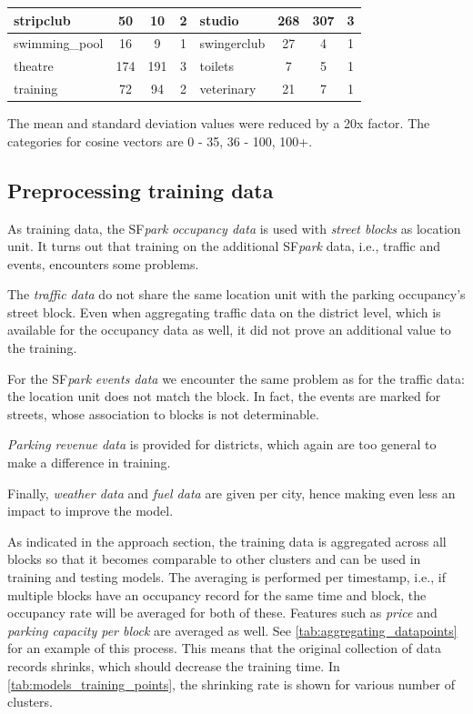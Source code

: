 \documentclass{ws-ijait}
\newcommand{\cmmnt}[1]{\ignorespaces}
\begin{document}
\begin{table}[!ht]
{\begin{tabular}{ | l | c | c | c || l | c | c | c |}
					stripclub & 50 & 10 & 2 & studio & 268 & 307 & 3 \\ \hline
					swimming\_pool & 16 & 9 & 1 & swingerclub & 27 & 4 & 1 \\ \hline
					theatre & 174 & 191 & 3 & toilets & 7 & 5 & 1 \\ \hline
					training & 72 & 94 & 2 & veterinary & 21 & 7 & 1 \\ \hline
			\end{tabular}}
			\label{tab:amenity_area_values}
			\begin{tabnote}
				The mean and standard deviation values were reduced by a 20x factor. The categories for cosine vectors are 0 - 35, 36 - 100, 100+.
			\end{tabnote}
		\end{table}
		
		\subsection{Preprocessing training data}
		As training data, the SF\textit{park} \textit{occupancy data} is used with \textit{street blocks} as location unit. 
		It turns out that training on the additional SF\textit{park} data, i.e., traffic and events, encounters some problems. 
		
		The \textit{traffic data} do not share the same location unit with the parking occupancy's street block. Even when aggregating traffic data on the district level, which is available for the occupancy data as well, it did not prove an additional value to the training. 
		
		For the SF\textit{park} \textit{events data} we encounter the same problem as for the traffic data: the location unit does not match the block. In fact, the events are marked for streets, whose association to blocks is not determinable. 
		
		\textit{Parking revenue data} is provided for districts, which again are too general to make a difference in training.
		
		Finally, \textit{weather data} and \textit{fuel data} are given per city, hence making even less an impact to improve the model.
		
		As indicated in the approach section\cmmnt{\cref{realization:machine_learning_models}}, the training data is aggregated across all blocks so that it becomes comparable to other clusters and can be used in training and testing models. The averaging is performed per timestamp, i.e., if multiple blocks have an occupancy record for the same time and block, the occupancy rate will be averaged for both of these. Features such as \textit{price} and \textit{parking capacity per block} are averaged as well. See \cref{tab:aggregating_datapoints} for an example of this process. This means that the original collection of data records shrinks, which should decrease the training time. In \cref{tab:models_training_points}, the shrinking rate is shown for various number of clusters.
		
\end{document}
